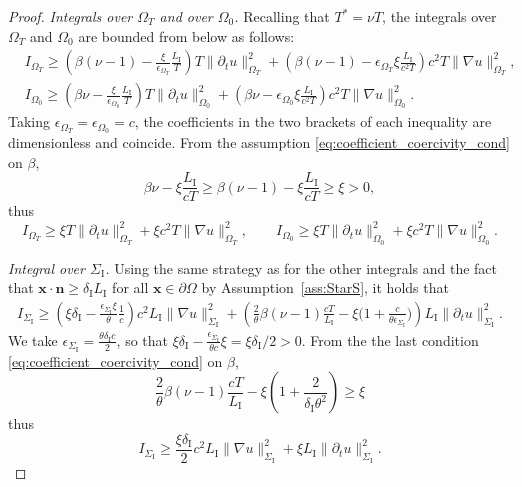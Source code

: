 \documentclass[10pt,a4paper]{amsart}
\newcommand{\Grad}[1]{\nabla #1}
\newcommand{\LI}{L_{\mathrm I}}
\newcommand{\OT}{{\Omega_T}}
\newcommand{\OZ}{{\Omega_0}}
\newcommand{\SI}{{\Sigma_{\mathrm I}}}
\newcommand{\TimeDer}{{\partial^{}_t}}
\newcommand{\deltaI}{{\delta_{\mathrm I}}}
\newcommand{\norm}[1]{\|#1\|}
\newcommand{\vect}[1]{\bm{#1}}
\begin{document}
\begin{proof}
	\textit{Integrals over $\OT$ and over $\OZ$.}
	Recalling that $T^* = \nu T$, the integrals over $\OT$ and $\OZ$ are bounded from below as follows:
	\begin{align*}
		 & I_\OT\geq \left(
		\beta (\nu-1) - \frac{\xi}{\epsilon_{\Omega_T}}\frac{\LI}{T}
		\right) T \norm{\TimeDer{u}}^2_{\OT}
		+ \left(\beta (\nu-1) - \epsilon_{\Omega_T} \xi \frac{\LI}{c^2 T}
		\right) c^2 T \norm{\Grad u}^2_{\OT},
		\\
		 & I_\OZ\geq \left(
		\beta \nu - \frac{\xi}{\epsilon_{\Omega_0}} \frac{\LI}{T}
		\right) T \norm{\TimeDer{u}}^2_{\OZ}
		+ \left(
		\beta \nu - \epsilon_{\Omega_0} \xi \frac{\LI}{c^2 T}
		\right) c^2 T \norm{\Grad u}^2_{\OZ}.
	\end{align*}
	Taking $\epsilon_{\Omega_T} = \epsilon_{\Omega_0} = c$, the coefficients in the two brackets of each inequality are dimensionless and coincide.
From the assumption \eqref{eq:coefficient_coercivity_cond} on $\beta$,
\begin{equation*}
		\beta \nu - \xi \frac{\LI}{cT} \geq \beta (\nu - 1) - \xi \frac{\LI}{cT} \geq \xi > 0,
	\end{equation*}
	thus
	\begin{equation}\label{eq:coerc:OTOZ}
		I_\OT\geq \xi T \norm{\TimeDer{u}}^2_\OT+\xi c^2 T \norm{\Grad u}^2_\OT,\qquad
		I_\OZ\geq \xi T \norm{\TimeDer{u}}^2_\OZ+\xi c^2 T \norm{\Grad u}^2_\OZ.
	\end{equation}


	\textit{Integral over ${\SI}$.}
	Using the same strategy as for the other integrals and the fact that $\vect{x} \cdot \vect{n} \geq \deltaI \LI$ for all $\vect{x} \in \partial {\Omega}$ by Assumption~\ref{ass:StarS}, it holds that
	\begin{align*}
		I_{\SI} \geq \left(
		\xi \deltaI - \frac{\epsilon_\SI \xi}{\theta} \frac{1}{c}
		\right) c^2 \LI \norm{\Grad u}^2_{{\SI}}
		+ \left(
		\frac2\theta \beta (\nu - 1) \frac{cT}{\LI} - \xi \Big(1 + \frac{c}{\theta \epsilon_{\SI}}\Big)
		\right) \LI \norm{\TimeDer{u}}_{{\SI}}^2.
	\end{align*}
	We take $\epsilon_{\SI} = \frac{\theta \deltaI c}{2}$, so that $ \xi \deltaI - \frac{\epsilon_{\SI}}{\theta c} \xi = \xi\deltaI/2 > 0$. From the the last condition \eqref{eq:coefficient_coercivity_cond} on $\beta$,
	\begin{equation*}
			\frac2\theta  \beta (\nu - 1) \frac{cT}{\LI} - \xi \left(1 + \frac{2}{\deltaI \theta^2} \right)
\geq \xi
	\end{equation*}
	thus
	\begin{equation}\label{eq:coerc:S}
		I_{\SI}\ge \frac{\xi\deltaI}2 c^2 \LI \norm{\Grad u}^2_{{\SI}}  + \xi \LI \norm{\TimeDer{u}}_{{\SI}}^2.
	\end{equation}


\end{proof}
\end{document}
